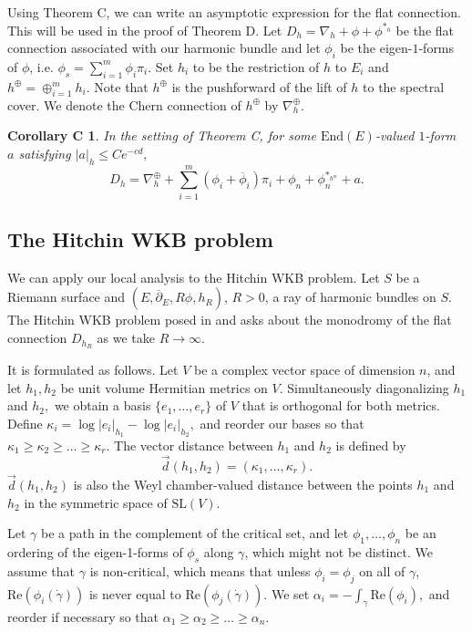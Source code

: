 \documentclass[10pt]{amsart}
\newtheorem*{corc}{Corollary C}
\theoremstyle{definition}
\begin{document}
Using Theorem C, we can write an asymptotic expression for the flat connection. This will be used in the proof of Theorem D. Let $D_h = \nabla_h + \phi+\phi^{*_h}$ be the flat connection associated with our harmonic bundle and let $\phi_i$ be the eigen-$1$-forms of $\phi$, i.e. $\phi_s=\sum_{i=1}^m \phi_i\pi_i.$ Set $h_i$ to be the restriction of $h$ to $E_i$ and $h^{\oplus}=\oplus_{i=1}^m h_i.$ Note that $h^{\oplus}$ is the pushforward of the lift of $h$ to the spectral cover. We denote the Chern connection of $h^{\oplus}$ by $\nabla_h^{\oplus}.$
\begin{corc} In the setting of Theorem C, for some $\textrm{End}(E)$-valued $1$-form $a$ satisfying $|a|_{h}\leq Ce^{-cd},$
$$D_h = \nabla^\oplus_h +  \sum_{i=1}^m (\phi_i+\overline{\phi}_i)\pi_i+ \phi_n +\phi_n^{*_{h^\oplus}}+a.$$
\end{corc}

\subsection{The Hitchin WKB problem}\label{HWKBsection}
We can apply our local analysis to the Hitchin WKB problem. Let $S$ be a Riemann surface and $(E,\overline{\partial}_E,R\phi, h_R)$, $R>0$, a ray of harmonic bundles on $S$. The Hitchin WKB problem posed in \cite{GMN} and \cite{KNPS} asks about the monodromy of the flat connection $D_{h_R}$ as we take $R\to \infty.$ 

It is formulated as follows. Let $V$ be a complex vector space of dimension $n$, and let $h_1,h_2$ be unit volume Hermitian metrics on $V.$ Simultaneously diagonalizing $h_1$ and $h_2,$ we obtain a basis $\{e_1,\dots, e_r\}$ of $V$ that is orthogonal for both metrics. Define $\kappa_i = \log |e_i|_{h_1}-\log|e_i|_{h_2},$ and reorder our bases so that $\kappa_1\geq \kappa_2\geq \dots \geq \kappa_r.$ The vector distance between $h_1$ and $h_2$ is defined by $$\vec{d}(h_1,h_2)=(\kappa_1,\dots, \kappa_r).$$ 
$\vec{d}(h_1,h_2)$ is also the Weyl chamber-valued distance between the points $h_1$ and $h_2$ in the symmetric space of $\textrm{SL}(V).$

Let $\gamma$ be a path in the complement of the critical set, and let $\phi_1, \ldots, \phi_n$ be an ordering of the eigen-1-forms of $\phi_s$ along $\gamma$, which might not be distinct. We assume that $\gamma$ is non-critical, which means that unless $\phi_i = \phi_j$ on all of $\gamma$, $\mathrm{Re}(\phi_i(\dot{\gamma}))$ is never equal to $\mathrm{Re}(\phi_j(\dot{\gamma}))$. We set $\alpha_i=-\int_\gamma \textrm{Re}(\phi_i),$ and reorder if necessary so that $\alpha_1\geq\alpha_2\geq \dots \geq \alpha_n.$
\end{document}

